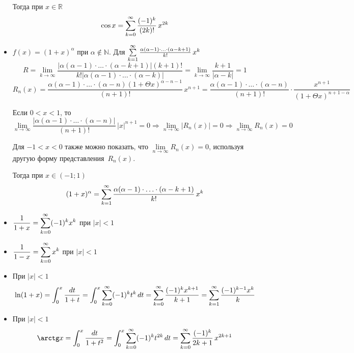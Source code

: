 \begin{itemize}
	Тогда при $x \in \mathbb R$
	\begin{equation*}
	\cos x = \series[0] \frac{(-1)^k}{(2k)!}\,x^{2k}
	\end{equation*}
	
	\item $f(x) = (1 + x)^\alpha$ при $\alpha \notin \mathbb N$.
	Для $\series \frac{\alpha (\alpha - 1) \cdot \ldots \cdot (\alpha - k + 1)}{k!}\,x^k$
	\begin{equation*}
	R = \lim_{k \to \infty} \frac
	{|\alpha (\alpha - 1) \cdot \ldots \cdot (\alpha - k + 1)| (k + 1)!}
	{k! |\alpha (\alpha - 1) \cdot \ldots \cdot (\alpha - k)|} =
	\lim_{k \to \infty} \frac{k + 1}{|\alpha - k|} = 1
	\end{equation*}
	\begin{equation*}
	R_n(x) = \frac{\alpha (\alpha - 1) \cdot \ldots \cdot (\alpha - n) (1 + \Theta x)^{\alpha-n-1}}{(n + 1)!}\,x^{n+1} =
	\frac{\alpha (\alpha - 1) \cdot \ldots \cdot (\alpha - n)}{(n + 1)!} \cdot
	\frac{x^{n+1}}{(1 + \Theta x)^{n+1-\alpha}}
	\end{equation*}
	
	Если $0 < x < 1$, то
	\begin{equation*}
	\lim_{n \to \infty} \frac{|\alpha (\alpha - 1) \cdot \ldots \cdot (\alpha - n)|}{(n + 1)!}\,|x|^{n+1} = 0 \Rightarrow
	\lim_{n \to \infty} |R_n(x)| = 0 \Rightarrow
	\lim_{n \to \infty} R_n(x) = 0
	\end{equation*}
	
	Для $-1 < x < 0$ также можно показать, что $\lim\limits_{n \to \infty} R_n(x) = 0$, используя другую форму представления~$R_n(x)$.
	
	Тогда при $x \in (-1; 1)$
	\begin{equation*}
	(1 + x)^\alpha = \series \frac{\alpha (\alpha - 1) \cdot \ldots \cdot (\alpha - k + 1)}{k!}\,x^k
	\end{equation*}
	
	\item $\displaystyle \frac1{1 + x} = \series[0] (-1)^k x^k$ при $|x| < 1$
	
	\item $\displaystyle \frac1{1 - x} = \series[0] x^k$ при $|x| < 1$
	
	\item При $|x| < 1$
	\begin{equation*}
	\ln (1 + x) =
	\int_0^x \frac{dt}{1 + t} =
	\int_0^x \series[0] (-1)^k t^k\,dt =
	\series[0] \frac{(-1)^k x^{k+1}}{k + 1} =
	\series \frac{(-1)^{k-1} x^k}{k}
	\end{equation*}
	
	\item При $|x| < 1$
	\begin{equation*}
	\arctg x =
	\int_0^x \frac{dt}{1 + t^2} =
	\int_0^x \series[0] (-1)^k t^{2k}\,dt =
	\series[0] \frac{(-1)^k}{2k + 1}\,x^{2k+1}
	\end{equation*}
\end{itemize}

